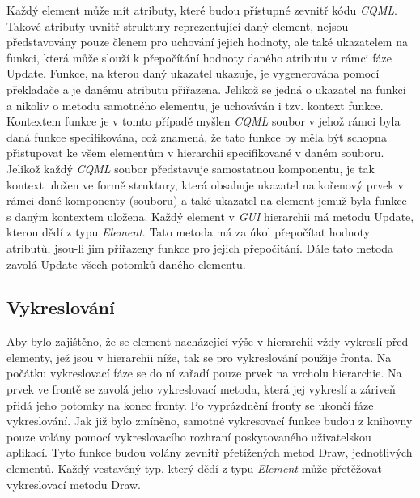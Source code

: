 \documentclass[11pt,twoside,a4paper]{book}
\begin{document}
{{\begin{ttemize}
{{Každý element může mít atributy, které budou přístupné zevnitř kódu \textit{CQML}. Takové atributy uvnitř struktury reprezentující daný element, nejsou představovány pouze členem pro uchování jejich hodnoty, ale také ukazatelem na funkci, která může slouží k přepočítání hodnoty daného atributu v rámci fáze Update. Funkce, na kterou daný ukazatel ukazuje, je vygenerována pomocí překladače a je danému atributu přiřazena. Jelikož se jedná o ukazatel na funkci a nikoliv o metodu samotného elementu, je uchováván i tzv. kontext funkce. Kontextem funkce je v tomto případě myšlen \textit{CQML} soubor v jehož rámci byla daná funkce specifikována, což znamená, že tato funkce by měla být schopna přistupovat ke všem elementům v hierarchii specifikované v daném souboru. Jelikož každý \textit{CQML} soubor představuje samostatnou komponentu, je tak kontext uložen ve formě struktury, která obsahuje ukazatel na kořenový prvek v rámci dané komponenty (souboru) a také ukazatel na element jemuž byla funkce s daným kontextem uložena.
Každý element v \textit{GUI} hierarchii má metodu Update, kterou dědí z typu \textit{Element}. Tato metoda má za úkol přepočítat hodnoty atributů, jsou-li jim přiřazeny funkce pro jejich přepočítání. Dále tato metoda zavolá Update všech potomků daného elementu.

\subsection {Vykreslování}
Aby bylo zajištěno, že se element nacházející výše v hierarchii vždy vykreslí před elementy, jež jsou v hierarchii níže, tak se pro vykreslování použije fronta. Na počátku vykreslovací fáze se do ní zařadí pouze prvek na vrcholu hierarchie. Na prvek ve frontě se zavolá jeho vykreslovací metoda, která jej vykreslí a záriveň přidá jeho potomky na konec fronty. Po vyprázdnění fronty se ukončí fáze vykreslování.
Jak již bylo zmíněno, samotné vykresovací funkce budou z knihovny pouze volány pomocí vykreslovacího rozhraní poskytovaného uživatelskou aplikací. Tyto funkce budou volány zevnitř přetížených metod Draw, jednotlivých elementů. Každý vestavěný typ, který dědí z typu \textit{Element} může přetěžovat vykreslovací metodu Draw.\\

}}
\end{ttemize}}}
\end{document}
